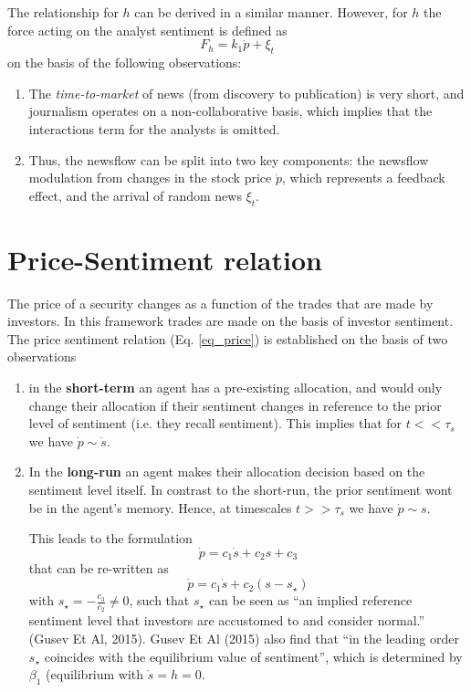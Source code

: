 \documentclass[11pt]{article}
\begin{document}
The relationship for $h$ can be derived in a similar manner. However, for $h$ the force acting on the analyst sentiment is defined as 
\begin{equation}
F_h = k_1 \dot{p} + \xi_t
\end{equation}
on the basis of the following observations:
\begin{enumerate}
\item The \textit{time-to-market} of news (from discovery to publication) is very short, and journalism operates on a non-collaborative basis, which implies that the interactions term for the analysts is omitted. 
\item Thus, the newsflow can be split into two key components: the newsflow modulation from changes in the stock price $\dot{p}$, which represents a feedback effect, and the arrival of random news $\xi_t$.
\end{enumerate}

\section{Price-Sentiment relation}
The price of a security changes as a function of the trades that are made by investors. In this framework trades are made on the basis of investor sentiment. The price sentiment relation (Eq. \eqref{eq_price}) is established on the basis of two observations
\begin{enumerate}
\item in the \textbf{short-term} an agent has a pre-existing allocation, and would only change their allocation if their sentiment changes in reference to the prior level of sentiment (i.e. they recall sentiment). This implies that for $t<<\tau_s$ we have $\dot{p}\sim\dot{s}$.
\item In the \textbf{long-run} an agent makes their allocation decision based on the sentiment level itself. In contrast to the short-run, the prior sentiment wont be in the agent's memory.  Hence, at timescales $t>>\tau_s$ we have $\dot{p}\sim s$. 

This leads to the formulation 
\begin{equation}
\dot{p}=c_1 \dot{s} + c_2 s + c_3
\end{equation}
that can be re-written as 
\begin{equation}
\dot{p}=c_1 \dot{s} + c_2 (s - s_\star)
\end{equation}
with $s_\star = -\frac{c_3}{c_2}\neq 0$, such that $s_\star$ can be seen as ``an implied reference sentiment level that investors are
accustomed to and consider normal.'' (Gusev Et Al, 2015). Gusev Et Al (2015) also find that ``in the leading order $s_\star$ coincides with the equilibrium value of sentiment'', which is determined by $\beta_1$ (equilibrium with $\dot{s}=h=0$.
\end{enumerate}
\end{document}
